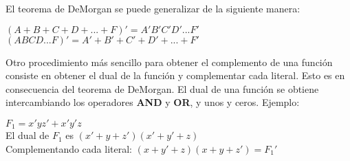 El teorema de DeMorgan se puede generalizar de la siguiente manera:
\begin{center}
    $(A + B + C + D + ... + F)' = A'B'C'D'...F'$ \\
    $(ABCD...F)' = A' + B' + C' + D' + ... + F'$
\end{center}

Otro procedimiento m\'{a}s sencillo para obtener el complemento de una
funci\'{o}n consiste en obtener el dual de la funci\'{o}n y complementar cada
literal. Esto es en consecuencia del teorema de DeMorgan. El dual de una
funci\'{o}n se obtiene intercambiando los operadores \textbf{AND} y \textbf{OR},
y unos y ceros. Ejemplo:
\begin{flushleft}
    $F_1 = x'yz' + x'y'z$ \\
    El dual de $F_1$ es $(x' + y + z')(x' + y' + z)$ \\
    Complementando cada literal: $(x + y' + z)(x + y + z') = F_1'$
\end{flushleft}
\newpage

